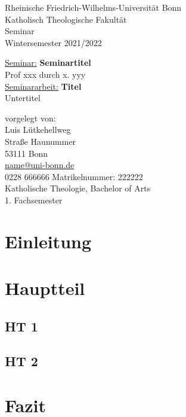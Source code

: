 \documentclass[12pt]{article}
\begin{document}
\begin{titlepage}
 \begin{center}
	\large 
	Rheinische Friedrich-Wilhelms-Universität Bonn \\ 
	Katholisch Theologische Fakultät \\ 
	Seminar\\
	\vspace{1.5cm} 
	Wintersemester 2021/2022 \\
	\vfill
	
	\underline{Seminar:} \medbreak
	\textbf{Seminartitel}\\
	\vspace{0.5 cm} 
	Prof xxx durch x. yyy\\
	\vspace{1.5cm}
	\underline{Seminararbeit:} \medbreak
	\textbf{Titel}\\
	 Untertitel
 \end{center}
 \vfill
 
 vorgelegt von:\\
 Luis Lütkehellweg \\
 Straße Haunummer \\
 53111 Bonn \\
\href{mailto:name@uni-bonn.de}{name@uni-bonn.de}  \\
0228 666666 \medbreak
Matrikelnummer: 222222\\
Katholische Theologie, Bachelor of Arts \\
1. Fachsemester\\
\end{titlepage}

\tableofcontents
\newpage

\section{Einleitung}
\lipsum[2-4]
\section{Hauptteil}
\subsection{HT 1}
\nocite{*} %

\lipsum[1-7]
\subsection{HT 2}
\lipsum[8-12]
\section{Fazit}
\lipsum

\printbibliography
\end{document}
